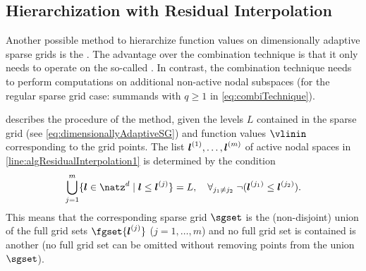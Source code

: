 \subsection{Hierarchization with Residual Interpolation}
\label{sec:433residualInterpolation}

Another possible method to hierarchize function values on
dimensionally adaptive sparse grids is the
.
The advantage over the combination technique is that
it only needs to operate on the so-called .
In contrast, the combination technique needs to perform computations
on additional non-active nodal subspaces
(for the regular sparse grid case:
summands with $q \ge 1$ in \eqref{eq:combiTechnique}).

 describes the procedure of the method,
given the levels $L$ contained in the sparse grid
(see \eqref{eq:dimensionallyAdaptiveSG})
and function values $\vlinin$ corresponding to the grid points.
The list ${\boldsymbol{l}}^{(1)}, \dotsc, {\boldsymbol{l}}^{(m)}$ of active nodal spaces
in \cref{line:algResidualInterpolation1} is determined by the condition
\begin{equation}
  \bigcup_{j=1}^m \{\*l \in \natz^d \mid \*l \le \*l^{(j)}\} = L,\quad
  \fa{j_1 \not= j_2}{\lnot(\*l^{(j_1)} \le \*l^{(j_2)})}.
\end{equation}
This means that the corresponding sparse grid $\sgset$
is the (non-disjoint) union of the full grid sets $\fgset{\*l^{(j)}}$
($j = 1, \dotsc, m$)
and no full grid set is contained is another
(no full grid set can be omitted without
removing points from the union $\sgset$).

